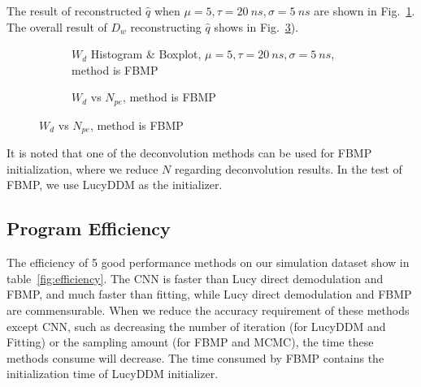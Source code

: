 The result of reconstructed $\hat{q}$ when $\mu=5, \tau=\SI{20}{ns}, \sigma=\SI{5}{ns}$ are shown in Fig.~\ref{fig:fbmp-hist}. The overall result of $D_w$ reconstructing $\hat{q}$ shows in Fig.~\ref{fig:fbmp-npe}). 

\begin{figure}[H]
\begin{minipage}[t]{.5\textwidth}
\begin{figure}[H]
    \centering
    \resizebox{\textwidth}{!}{}
    \caption{\label{fig:fbmp-hist} $W_{d}$ Histogram \& Boxplot, $\mu=5, \tau=\SI{20}{ns}, \sigma=\SI{5}{ns}$, method is FBMP}
\end{figure}
\end{minipage}
\begin{minipage}[t]{.5\textwidth}
\begin{figure}[H]
    \centering
    \resizebox{\textwidth}{!}{}
    \caption{\label{fig:fbmp-npe} $W_{d}$ vs $N_{pe}$, method is FBMP}
\end{figure}
\end{minipage}
\end{figure}

It is noted that one of the deconvolution methods can be used for FBMP initialization, where we reduce $N$ regarding deconvolution results. In the test of FBMP, we use LucyDDM as the initializer. 

\subsection{Program Efficiency}

The efficiency of 5 good performance methods on our simulation dataset show in table~\ref{fig:efficiency}. The CNN is faster than Lucy direct demodulation and FBMP, and much faster than fitting, while Lucy direct demodulation and FBMP are commensurable. When we reduce the accuracy requirement of these methods except CNN, such as decreasing the number of iteration (for LucyDDM and Fitting) or the sampling amount (for FBMP and MCMC), the time these methods consume will decrease. The time consumed by FBMP contains the initialization time of LucyDDM initializer. 

